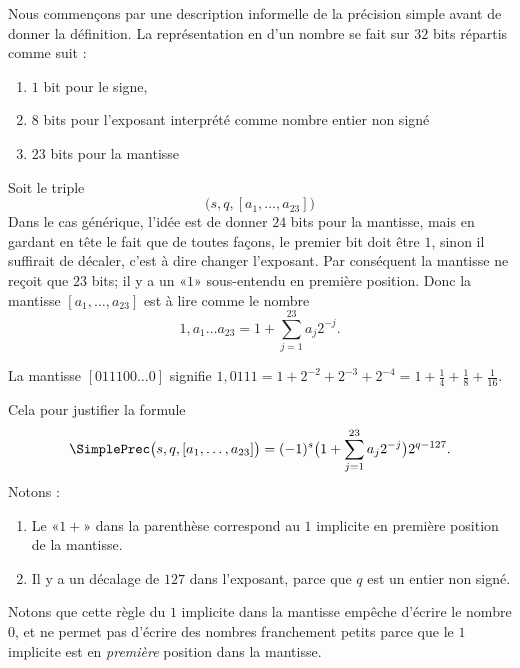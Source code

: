 Nous commençons par une description informelle de la précision simple avant de donner la définition. La représentation en  d'un nombre se fait sur \( 32\) bits répartis comme suit :
\begin{enumerate}
    \item
        \( 1\) bit pour le signe,
    \item
        \( 8\) bits pour l'exposant interprété comme nombre entier non signé
    \item
        \( 23\) bits pour la mantisse
\end{enumerate}
Soit le triple
\begin{equation}
    \big( s,q,[a_1,\ldots, a_{23}] \big)
\end{equation}
Dans le cas générique, l'idée est de donner \( 24\) bits pour la mantisse, mais en gardant en tête le fait que de toutes façons, le premier bit doit être \( 1\), sinon il suffirait de décaler, c'est à dire changer l'exposant. Par conséquent la mantisse ne reçoit que \( 23\) bits; il y a un «\( 1\)» sous-entendu en première position. Donc la mantisse \( [a_1,\ldots, a_{23}]\) est à lire comme le nombre
\begin{equation}
    1,a_1\ldots a_{23}=1+\sum_{j=1}^{23}a_j2^{-j}.
\end{equation}
\begin{example}
    La mantisse \( [011100\ldots 0]\) signifie \(1,0111=1+2^{-2}+2^{-3}+2^{-4}=1+\frac{1}{ 4 }+\frac{1}{ 8 }+\frac{1}{ 16 } \).
\end{example}
Cela pour justifier la formule
\begin{equation}
    \SimplePrec\big( s,q,[a_1,\ldots, a_{23}] \big)=(-1)^s\big( 1+\sum_{j=1}^{23}a_j2^{-j} \big)2^{q-127}.
\end{equation}
Notons :
\begin{enumerate}
    \item
        Le «\( 1+\)» dans la parenthèse correspond au \( 1\) implicite en première position de la mantisse.
    \item
        Il y a un décalage de \( 127\) dans l'exposant, parce que \( q\) est un entier non signé.
\end{enumerate}

Notons que cette règle du \( 1\) implicite dans la mantisse empêche d'écrire le nombre \( 0\), et ne permet pas d'écrire des nombres franchement petits parce que le \( 1\) implicite est en \emph{première} position dans la mantisse.

